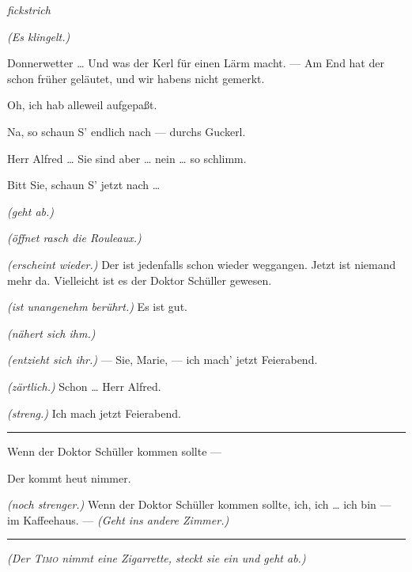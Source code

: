 \documentclass[
	final,
	a4paper,
	ngerman,
	mpinclude = true, %
	twoside = true,
	open = right,
	cleardoublepage = plain,
	DIV = 13,
	BCOR = 1cm,
	titlepage = firstiscover,
	]{scrbook}
\newcommand{\direction}[1]{\textit{(#1)}}
\newcommand{\hiat}{%
	\begin{center}
		\tiny
		\raisebox{0.5ex}{\rule{0.3\linewidth}{0.4pt}}
		\textit{fickstrich}
		\raisebox{0.5ex}{\rule{0.3\linewidth}{0.4pt}}
	\end{center}
}
\newenvironment{deletion}{%
		\vspace{0.25\baselineskip}
		\hrule
		\vspace{0.25\baselineskip}
		\color{darkgray}
	}{
		\color{black}
		\vspace{0.25\baselineskip}
		\hrule 
		\vspace{0.25\baselineskip}
	}
\newcommand{\thecharacter}[1]{\textup{\textsc{#1}}\xspace}
\newcommand{\thepraktikant}{\thecharacter{Timo}}
\newcommand{\theherr}{\thecharacter{Benjamin}}
\newcommand{\character}[1]{\item[#1:]}
\newcommand{\praktikant}{\character{\thepraktikant}}
\newcommand{\herr}{\character{\theherr}}
\begin{document}
\begin{play}
	\hiat

	\direction{Es klingelt.}

	\herr
	Donnerwetter \ldots{} Und was der Kerl für einen Lärm macht. --- Am End hat der schon früher geläutet, und wir habens nicht gemerkt.

	\praktikant
	Oh, ich hab alleweil aufgepaßt.

	\herr
	Na, so schaun S' endlich nach --- durchs Guckerl.

	\praktikant
	Herr Alfred \ldots{} Sie sind aber \ldots{} nein \ldots{} so schlimm.

	\herr
	Bitt Sie, schaun S' jetzt nach \ldots{}

	\praktikant
	\direction{geht ab.}

	\herr
	\direction{öffnet rasch die Rouleaux.}

	\praktikant
	\direction{erscheint wieder.} Der ist jedenfalls schon wieder weggangen. Jetzt ist niemand mehr da. Vielleicht ist es der Doktor Schüller gewesen.

	\herr
	\direction{ist unangenehm berührt.} Es ist gut.

	\praktikant
	\direction{nähert sich ihm.}

	\herr
	\direction{entzieht sich ihr.} --- Sie, Marie, --- ich mach' jetzt Feierabend.

	\praktikant
	\direction{zärtlich.} Schon \ldots{} Herr Alfred.

	\herr
	\direction{streng.} Ich mach jetzt Feierabend.
	\begin{deletion}
		Wenn der Doktor Schüller kommen sollte ---

	\praktikant
	Der kommt heut nimmer.

	\herr
	\direction{noch strenger.} Wenn der Doktor Schüller kommen sollte, ich, ich \ldots{} ich bin --- im Kaffeehaus. --- \direction{Geht ins andere Zimmer.}
	\end{deletion}

	\direction{Der \thepraktikant{} nimmt eine Zigarrette, steckt sie ein und geht ab.}

\end{play}
\end{document}
